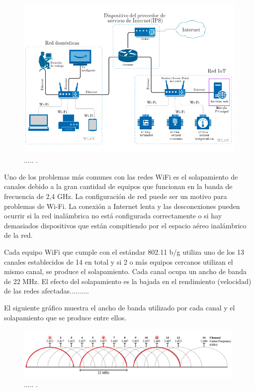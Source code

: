 \begin{landscape} %
\begin{figure}[htpb]
\centering 
\includegraphics[width=1.3\textwidth]{./Figures/rediot.png}
\caption{..... .}
\label{fig:diagramared}
\end{figure}
\end{landscape} %

Uno de los problemas más comunes con las redes WiFi es el solapamiento de canales debido a la gran cantidad de equipos que funcionan en la banda de frecuencia de 2,4 GHz. La configuración de red puede ser un motivo para problemas de Wi-Fi. La conexión a Internet lenta y las desconexiones pueden ocurrir si la red inalámbrica no está configurada correctamente o si hay demasiados dispositivos que están compitiendo por el espacio aéreo inalámbrico de la red. 

Cada equipo WiFi que cumple con el estándar 802.11 b/g utiliza uno de los 13 canales establecidos de 14 en total y si 2 o más equipos cercanos utilizan el mismo canal, se produce el solapamiento. Cada canal ocupa un ancho de banda de 22 MHz. El efecto del solapamiento es la bajada en el rendimiento (velocidad) de las redes afectadas..........

El siguiente gráfico muestra el ancho de banda utilizado por cada canal y el solapamiento que se produce entre ellos.

\begin{figure}[htpb]
\centering 
\includegraphics[width=0.99\textwidth]{./Figures/canales.png}
\caption{..... .}
\label{fig:canales}
\end{figure}

